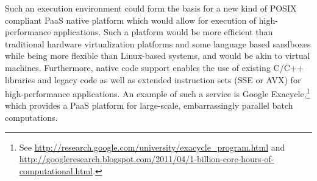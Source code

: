 

Such an execution environment could form the basis for a new kind of
POSIX compliant PaaS native platform which would allow for execution of
high-performance applications. Such a platform would be more efficient
than traditional hardware virtualization platforms and some language
based sandboxes while being more flexible than Linux-based systems, and
would be akin to virtual machines.  Furthermore, native code support
enables the use of existing C/C++ libraries and legacy code as well as
extended instruction sets (\eg SSE or AVX) for high-performance
applications. An example of such a service is Google
Exacycle,\footnote{See
\url{http://research.google.com/university/exacycle_program.html} and
\url{http://googleresearch.blogspot.com/2011/04/1-billion-core-hours-of-computational.html}.}
which provides a PaaS platform for large-scale, embarrassingly parallel
batch computations.



